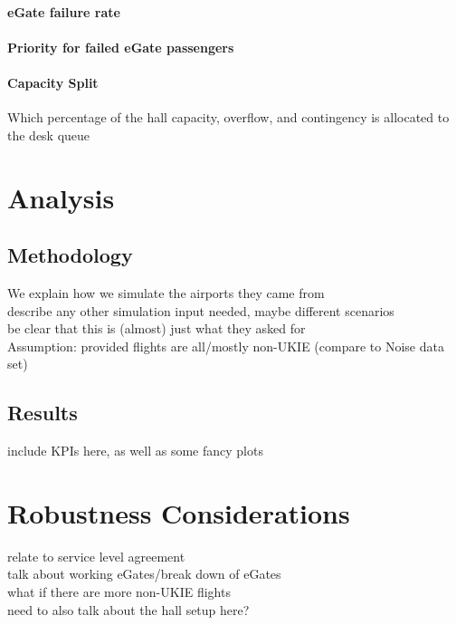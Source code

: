 \documentclass[10pt]{article}
\begin{document}
\paragraph{eGate failure rate}

\paragraph{Priority for failed eGate passengers}

\paragraph{Capacity Split}
Which percentage of the hall capacity, overflow, and contingency is allocated to the desk queue


\section{Analysis}

\subsection{Methodology}
We explain how we simulate the airports they came from \\
describe any other simulation input needed, maybe different scenarios \\ 
be clear that this is (almost) just what they asked for  \\ Assumption: provided flights are all/mostly non-UKIE (compare to Noise data set)



\subsection{Results}
include KPIs here, as well as some fancy plots



\section{Robustness Considerations}
relate to service level agreement \\
talk about working eGates/break down of eGates  \\
what if there are more non-UKIE flights  \\ 
need to also talk about the hall setup here?
\end{document}
